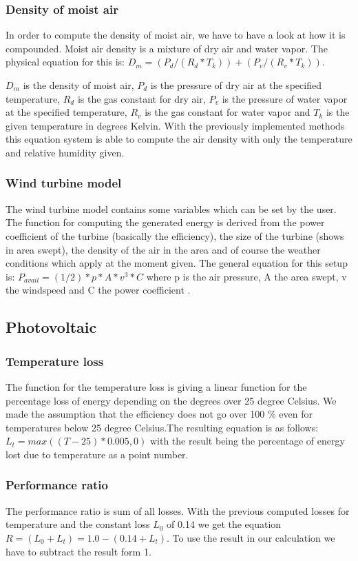 \subsubsection{Density of moist air}
In order to compute the density of moist air, we have to have a look at how it is compounded. Moist air density is a mixture of dry air and water vapor. The physical equation for this is: $D_m = (P_d/(R_d * T_k))+(P_v/(R_v*T_k))$.

$D_m$ is the density of moist air, $P_d$ is the pressure of dry air at the specified temperature, $R_d$ is the gas constant for dry air, $P_v$ is the pressure of water vapor at the specified temperature, $R_v$ is the gas constant for water vapor and $T_k$ is the given temperature in degrees Kelvin. With the previously implemented methods this equation system is able to compute the air density with only the temperature and relative humidity given\cite{AirDensity,Shelquist}.
\subsubsection{Wind turbine model}
The wind turbine model contains some variables which can be set by the user. The function for computing the generated energy is derived from the power coefficient of the turbine (basically the efficiency), the size of the turbine (shows in area swept), the density of the air in the area and of course the weather conditions which apply at the moment given.
The general equation for this setup is: $P_{avail} = (1/2) * p * A * v^{3} * C$
where p is the air pressure, A the area swept, v the windspeed and C the power coefficient \cite{WindPowerCalcs}.

\subsection{Photovoltaic}
\subsubsection{Temperature loss}
The function for the temperature loss is giving a linear function for the percentage loss of energy depending on the degrees over 25 degree Celsius. We made the assumption that the efficiency does not go over 100 \% even for temperatures below 25 degree Celsius.The resulting equation is as follows: $L_t = max((T-25)*0.005 , 0)$ with the result being the percentage of energy lost due to temperature as a point number.
\subsubsection{Performance ratio}
The performance ratio is sum of all losses.
With the previous computed losses for temperature and the constant loss $L_0$ of 0.14 we get the equation $R = (L_0 + L_t) = 1.0 - (0.14 + L_t)$. To use  the result in our calculation we have to subtract the result form 1.
